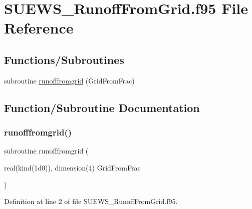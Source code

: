 \hypertarget{_s_u_e_w_s___runoff_from_grid_8f95}{}\section{S\+U\+E\+W\+S\+\_\+\+Runoff\+From\+Grid.\+f95 File Reference}
\label{_s_u_e_w_s___runoff_from_grid_8f95}
\subsection*{Functions/\+Subroutines}
\begin{DoxyCompactItemize}
\item 
subroutine \hyperlink{_s_u_e_w_s___runoff_from_grid_8f95_a97311f166d489417f89d55e79d5f63c2}{runofffromgrid} (Grid\+From\+Frac)
\end{DoxyCompactItemize}


\subsection{Function/\+Subroutine Documentation}
\mbox{\label{_s_u_e_w_s___runoff_from_grid_8f95_a97311f166d489417f89d55e79d5f63c2}} 
\subsubsection{\texorpdfstring{runofffromgrid()}{runofffromgrid()}}
{\footnotesize\ttfamily subroutine runofffromgrid (\begin{DoxyParamCaption}\item[{real(kind(1d0)), dimension(4)}]{Grid\+From\+Frac }\end{DoxyParamCaption})}



Definition at line 2 of file S\+U\+E\+W\+S\+\_\+\+Runoff\+From\+Grid.\+f95.

